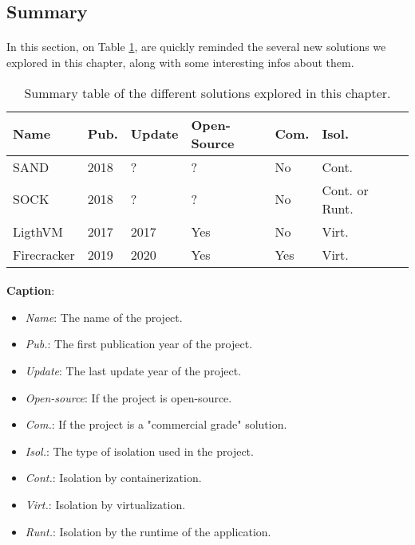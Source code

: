 \subsection{Summary}
\paragraph{}In this section, on Table \ref{tab:summary}, are quickly reminded the several new solutions we explored in this chapter, along with some interesting infos about them.
\begin{table}[!h]

  \begin{center}
    \begin{tabular}{|p{}|p{}|p{}|p{}|p{}|p{}|p{}|}
       \hline
       \textbf{Name} & \textbf{Pub.} & \textbf{Update} & \textbf{Open-Source} & \textbf{Com.} & \textbf{Isol.} \\
       \hline
       SAND\cite{akkus2018sand} & 2018 & ? & ? & No & Cont. \\
       \hline
       SOCK\cite{oakes2018sock} & 2018 & ? & ? & No & Cont. or Runt. \\
       \hline
       LigthVM\cite{manco2017my} & 2017 & 2017 & Yes & No & Virt. \\
       \hline
       Firecracker\cite{agachefirecracker} & 2019 & 2020 & Yes & Yes & Virt.\\
       \hline
    \end{tabular}
  \end{center}
  \caption{Summary table of the different solutions explored in this chapter.}
  \label{tab:summary}
\end{table}
\paragraph{}\textbf{Caption}: 
\begin{itemize}
\renewcommand\labelitemi{--}
  \item \textit{Name}: The name of the project.
  \item \textit{Pub.}: The first publication year of the project.
  \item \textit{Update}: The last update year of the project.
  \item \textit{Open-source}: If the project is open-source.
  \item \textit{Com.}: If the project is a "commercial grade" solution.
  \item \textit{Isol.}: The type of isolation used in the project.
  \item \textit{Cont.}: Isolation by containerization.
  \item \textit{Virt.}: Isolation by virtualization.
  \item \textit{Runt.}: Isolation by the runtime of the application.
\end{itemize}

